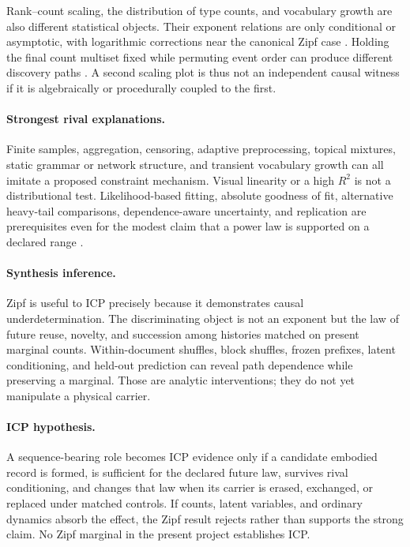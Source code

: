 Rank--count scaling, the distribution of type counts, and vocabulary growth
are also different statistical objects.  Their exponent relations are only
conditional or asymptotic, with logarithmic corrections near the canonical
Zipf case \citep{RosilloRodesEtAl2026TypeToken}.  Holding the final count
multiset fixed while permuting event order can produce different discovery
paths \citep{ZimmerlinEtAl2026Discovery}.  A second scaling plot is thus not an
independent causal witness if it is algebraically or procedurally coupled to
the first.

\paragraph{Strongest rival explanations.}
Finite samples, aggregation, censoring, adaptive preprocessing, topical
mixtures, static grammar or network structure, and transient vocabulary growth
can all imitate a proposed constraint mechanism.  Visual linearity or a high
$R^2$ is not a distributional test.  Likelihood-based fitting, absolute
goodness of fit, alternative heavy-tail comparisons, dependence-aware
uncertainty, and replication are prerequisites even for the modest claim that
a power law is supported on a declared range
\citep{ClausetEtAl2009PowerLaws,CorralEtAl2020DistinctFlavors}.

\paragraph{Synthesis inference.}
Zipf is useful to ICP precisely because it demonstrates causal
underdetermination.  The discriminating object is not an exponent but the law
of future reuse, novelty, and succession among histories matched on present
marginal counts.  Within-document shuffles, block shuffles, frozen prefixes,
latent conditioning, and held-out prediction can reveal path dependence while
preserving a marginal.  Those are analytic interventions; they do not yet
manipulate a physical carrier.

\paragraph{ICP hypothesis.}
A sequence-bearing role becomes ICP evidence only if a candidate embodied
record is formed, is sufficient for the declared future law, survives rival
conditioning, and changes that law when its carrier is erased, exchanged, or
replaced under matched controls.  If counts, latent variables, and ordinary
dynamics absorb the effect, the Zipf result rejects rather than supports the
strong claim.  No Zipf marginal in the present project establishes ICP.

